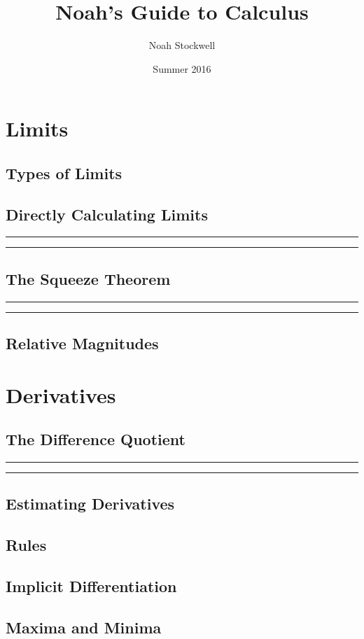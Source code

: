 \documentclass{article}
\title{Noah's Guide to Calculus}
\author{Noah Stockwell}
\date{Summer 2016}
\newcommand{\newchapter}[2]
{
	\subsection{#1}\noindent\rule[0.5ex]{\linewidth}{1pt}\newpage\noindent\rule[0.5ex]{\linewidth}{1pt}\newpage\newpage
}
\begin{document}
\maketitle
\vspace{2in}
\begin{center}\end{center}
\newpage

\newpage
\tableofcontents
\newpage
\section{Limits} 
\subsection{Types of Limits}  
\newchapter{Directly Calculating Limits}{DirectlyCalculatingLimits}
\newchapter{The Squeeze Theorem}{SqueezeTheorem}
\subsection{Relative Magnitudes} \newpage
\section{Derivatives} 
\newchapter{The Difference Quotient}{DifferenceQuotient}
\subsection{Estimating Derivatives}
\subsection{Rules} 
\subsection{Implicit Differentiation}\newpage
\subsection{Maxima and Minima} 
\end{document}
